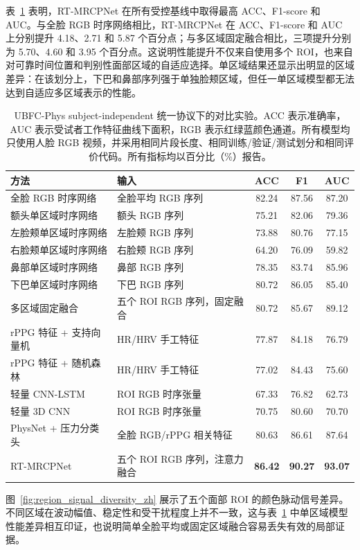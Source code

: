 \documentclass[runningheads]{llncs}
\begin{document}
表~\ref{tab:main_results_zh} 表明，RT-MRCPNet 在所有受控基线中取得最高 ACC、F1-score 和 AUC。与全脸 RGB 时序网络相比，RT-MRCPNet 在 ACC、F1-score 和 AUC 上分别提升 4.18、2.71 和 5.87 个百分点；与多区域固定融合相比，三项提升分别为 5.70、4.60 和 3.95 个百分点。这说明性能提升不仅来自使用多个 ROI，也来自对可靠时间位置和判别性面部区域的自适应选择。单区域结果还显示出明显的区域差异：在该划分上，下巴和鼻部序列强于单独脸颊区域，但任一单区域模型都无法达到自适应多区域表示的性能。

\begin{table}
\caption{UBFC-Phys subject-independent 统一协议下的对比实验。ACC 表示准确率，AUC 表示受试者工作特征曲线下面积，RGB 表示红绿蓝颜色通道。所有模型均只使用人脸 RGB 视频，并采用相同片段长度、相同训练/验证/测试划分和相同评价代码。所有指标均以百分比（\%）报告。}
\label{tab:main_results_zh}
\centering
\small
\begin{tabular}{p{3.6cm}p{4.1cm}ccc}
\toprule
方法 & 输入 & ACC & F1 & AUC \\
\midrule
全脸 RGB 时序网络 & 全脸平均 RGB 序列 & 82.24 & 87.56 & 87.20 \\
额头单区域时序网络 & 额头 RGB 序列 & 75.21 & 82.06 & 79.36 \\
左脸颊单区域时序网络 & 左脸颊 RGB 序列 & 73.88 & 80.76 & 77.15 \\
右脸颊单区域时序网络 & 右脸颊 RGB 序列 & 64.20 & 76.09 & 59.82 \\
鼻部单区域时序网络 & 鼻部 RGB 序列 & 78.35 & 83.74 & 85.96 \\
下巴单区域时序网络 & 下巴 RGB 序列 & 80.72 & 86.05 & 85.40 \\
多区域固定融合 & 五个 ROI RGB 序列，固定融合 & 80.72 & 85.67 & 89.12 \\
rPPG 特征 + 支持向量机 & HR/HRV 手工特征 & 77.87 & 84.18 & 76.79 \\
rPPG 特征 + 随机森林 & HR/HRV 手工特征 & 77.02 & 84.43 & 75.60 \\
轻量 CNN-LSTM & ROI RGB 时序张量 & 67.33 & 76.82 & 62.73 \\
轻量 3D CNN & ROI RGB 时序张量 & 70.75 & 80.60 & 70.70 \\
PhysNet + 压力分类头 & 全脸 RGB/rPPG 相关特征 & 80.63 & 86.61 & 87.64 \\
RT-MRCPNet & 五个 ROI RGB 序列，注意力融合 & \textbf{86.42} & \textbf{90.27} & \textbf{93.07} \\
\bottomrule
\end{tabular}
\end{table}

图~\ref{fig:region_signal_diversity_zh} 展示了五个面部 ROI 的颜色脉动信号差异。不同区域在波动幅值、稳定性和受干扰程度上并不一致，这与表~\ref{tab:main_results_zh} 中单区域模型性能差异相互印证，也说明简单全脸平均或固定区域融合容易丢失有效的局部证据。
\end{document}
